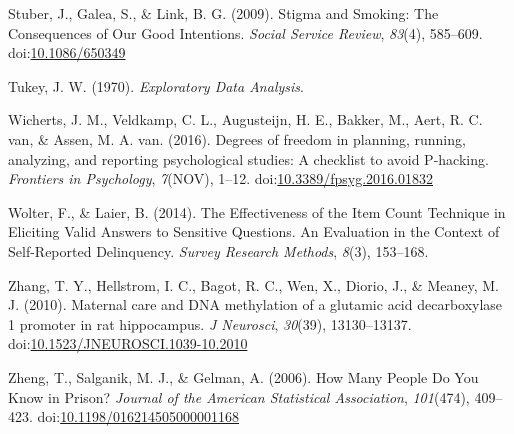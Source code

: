 \documentclass[,jou]{apa6}
\theoremstyle{definition}
\theoremstyle{definition}
\theoremstyle{definition}
\theoremstyle{remark}
\begin{document}
\hypertarget{ref-Stuber2009}{}
Stuber, J., Galea, S., \& Link, B. G. (2009). Stigma and Smoking: The
Consequences of Our Good Intentions. \emph{Social Service Review},
\emph{83}(4), 585--609.
doi:\href{https://doi.org/10.1086/650349}{10.1086/650349}

\hypertarget{ref-Tukey1970}{}
Tukey, J. W. (1970). \emph{Exploratory Data Analysis}.

\hypertarget{ref-Wicherts2016}{}
Wicherts, J. M., Veldkamp, C. L., Augusteijn, H. E., Bakker, M., Aert,
R. C. van, \& Assen, M. A. van. (2016). Degrees of freedom in planning,
running, analyzing, and reporting psychological studies: A checklist to
avoid P-hacking. \emph{Frontiers in Psychology}, \emph{7}(NOV), 1--12.
doi:\href{https://doi.org/10.3389/fpsyg.2016.01832}{10.3389/fpsyg.2016.01832}

\hypertarget{ref-Wolter2014}{}
Wolter, F., \& Laier, B. (2014). The Effectiveness of the Item Count
Technique in Eliciting Valid Answers to Sensitive Questions. An
Evaluation in the Context of Self-Reported Delinquency. \emph{Survey
Research Methods}, \emph{8}(3), 153--168.

\hypertarget{ref-Zhang2010}{}
Zhang, T. Y., Hellstrom, I. C., Bagot, R. C., Wen, X., Diorio, J., \&
Meaney, M. J. (2010). Maternal care and DNA methylation of a glutamic
acid decarboxylase 1 promoter in rat hippocampus. \emph{J Neurosci},
\emph{30}(39), 13130--13137.
doi:\href{https://doi.org/10.1523/JNEUROSCI.1039-10.2010}{10.1523/JNEUROSCI.1039-10.2010}

\hypertarget{ref-Zheng2006}{}
Zheng, T., Salganik, M. J., \& Gelman, A. (2006). How Many People Do You
Know in Prison? \emph{Journal of the American Statistical Association},
\emph{101}(474), 409--423.
doi:\href{https://doi.org/10.1198/016214505000001168}{10.1198/016214505000001168}

\endgroup
\end{document}
